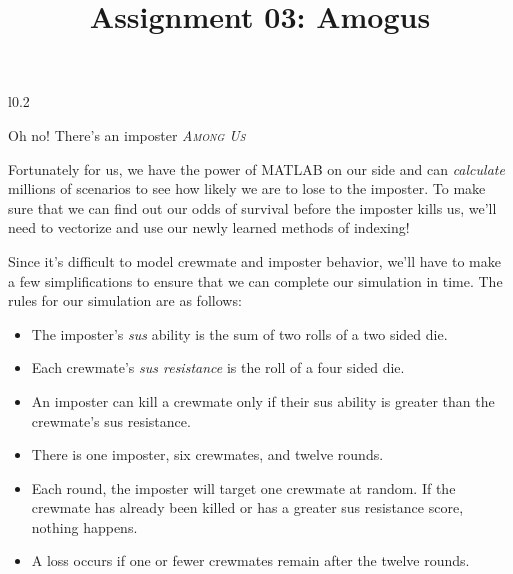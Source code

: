 \documentclass{article}
\title{Assignment 03: Amogus}
\begin{document}
\renderTitle

\begin{wrapfigure}{l}{0.2\textwidth}
\end{wrapfigure}

Oh no!  There's an imposter \textit{\textsc{Among Us}} 

Fortunately for us, we have the power of MATLAB on our side and can
\emph{calculate} millions of scenarios to see how likely we are to lose
to the imposter.  To make sure that we can find out our odds of survival
before the imposter kills us, we'll need to vectorize and use our newly
learned methods of indexing!

Since it's difficult to model crewmate and imposter behavior, we'll have
to make a few simplifications to ensure that we can complete our
simulation in time.  The rules for our simulation are as follows:

\begin{itemize}[leftmargin=*]
	\item
		The imposter's \emph{sus} ability is the sum of two
		rolls of a two sided die.

	\item
		Each crewmate's \emph{sus resistance} is the roll of a
		four sided die.

	\item
		An imposter can kill a crewmate only if their sus ability is
		greater than the crewmate's sus resistance.

	\item
		There is one imposter, six crewmates, and twelve rounds.

	\item
		Each round, the imposter will target one crewmate at
		random.  If the crewmate has already been killed or has
		a greater sus resistance score, nothing happens.

	\item
		A loss occurs if one or fewer crewmates remain after the
		twelve rounds.
\end{itemize}
\end{document}
